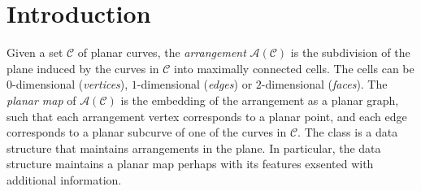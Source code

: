 \renewcommand{\Re}{{\rm I\!\hspace{-0.025em} R}}

\def\C{{\cal C}}
\def\G{{\cal G}}
\def\F{{\cal F}}
\def\I{{\cal I}}
\def\U{{\cal U}}
\def\M{{\cal M}}
\def\eps{{\varepsilon}}
\def\bd{{\partial}}
\def\dm{{\cal D}}

\section{Introduction}
\label{arr_sec:intro}
Given a set $\mathcal{C}$ of planar curves, the {\em arrangement}
${\mathcal A}({\mathcal C})$ is the subdivision of the plane induced
by the curves in $\mathcal{C}$ into maximally connected cells. The cells
can be $0$-dimensional ({\em vertices}), $1$-dimensional ({\em edges})
or $2$-dimensional ({\em faces}). The {\em planar map} of ${\mathcal
A}({\mathcal C})$ is the embedding of the arrangement as a planar
graph, such that each arrangement vertex corresponds to a planar
point, and each edge corresponds to a planar subcurve of one of the
curves in ${\mathcal C}$.
The class  is a data structure that maintains
arrangements in the plane. In particular, the data structure maintains a
planar map perhaps with its features exsented with additional information.

